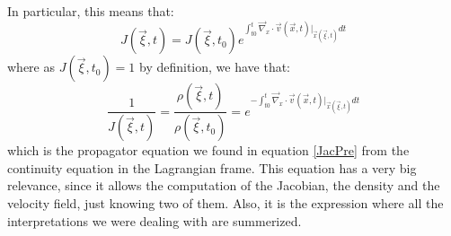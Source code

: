 \documentclass[11pt, a4paper]{article} %
\begin{document}
In particular, this means that:
\begin{equation}
J(\vec{\xi},t)=J(\vec{\xi},t_0)e^{\int_{t0}^t \vec{\nabla}_x\cdot\vec{v}(\vec{x},t)\Big\rvert_{\vec{x}(\vec{\xi},t)}dt}
\end{equation}
where as $J(\vec{\xi},t_0)=1$ by definition, we have that:
\begin{equation}
\frac{1}{J(\vec{\xi},t)}=\frac{\rho(\vec{\xi},t)}{\rho(\vec{\xi},t_0)}=e^{-\int_{t0}^t \vec{\nabla}_x\cdot\vec{v}(\vec{x},t)\Big\rvert_{\vec{x}(\vec{\xi},t)}dt}
\end{equation}
which is the propagator equation we found in equation \eqref{JacPre} from the continuity equation in the Lagrangian frame. This equation has a very big relevance, since it allows the computation of the Jacobian, the density and the velocity field, just knowing two of them. Also, it is the expression where all the interpretations we were dealing with are summerized.

\newpage
\end{document}

